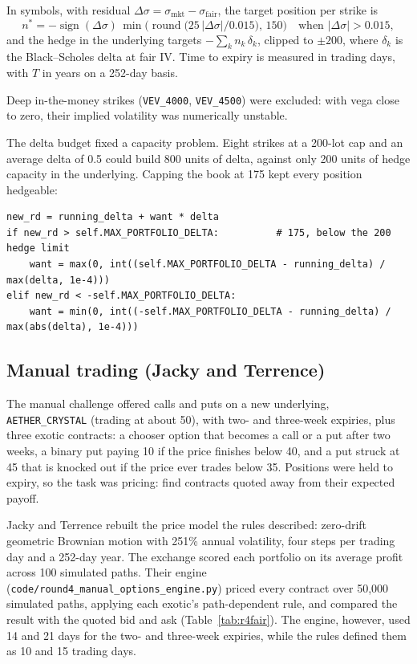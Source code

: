 \documentclass[11pt,a4paper]{article}
\newcommand{\pname}[1]{\texttt{#1}}
\begin{document}
In symbols, with residual $\Delta\sigma=\sigma_{\text{mkt}}-\sigma_{\text{fair}}$, the target position per
strike is
\[
n^\ast=-\operatorname{sign}(\Delta\sigma)\,\min\!\Big(\operatorname{round}\big(25\,|\Delta\sigma|/0.015\big),\,150\Big)
\quad\text{when } |\Delta\sigma|>0.015,
\]
and the hedge in the underlying targets $-\sum_k n_k\,\delta_k$, clipped to $\pm200$, where $\delta_k$ is the
Black--Scholes delta at fair IV. Time to expiry is measured in trading days, with $T$ in years on a 252-day
basis.

Deep in-the-money strikes (\pname{VEV\_4000}, \pname{VEV\_4500}) were excluded: with vega close to zero, their
implied volatility was numerically unstable.

The delta budget fixed a capacity problem. Eight strikes at a 200-lot cap and an average delta of 0.5 could
build 800 units of delta, against only 200 units of hedge capacity in the underlying. Capping the book at 175
kept every position hedgeable:

\noindent\begin{minipage}{\linewidth}
\begin{lstlisting}
new_rd = running_delta + want * delta
if new_rd > self.MAX_PORTFOLIO_DELTA:          # 175, below the 200 hedge limit
    want = max(0, int((self.MAX_PORTFOLIO_DELTA - running_delta) / max(delta, 1e-4)))
elif new_rd < -self.MAX_PORTFOLIO_DELTA:
    want = min(0, int((-self.MAX_PORTFOLIO_DELTA - running_delta) / max(abs(delta), 1e-4)))
\end{lstlisting}
\end{minipage}



\FloatBarrier
\subsection{Manual trading (Jacky and Terrence)}
The manual challenge offered calls and puts on a new underlying, \pname{AETHER\_CRYSTAL} (trading at about 50),
with two- and three-week expiries, plus three exotic contracts: a chooser option that becomes a call or a put
after two weeks, a binary put paying 10 if the price finishes below 40, and a put struck at 45 that is knocked
out if the price ever trades below 35. Positions were held to expiry, so the task was pricing: find contracts
quoted away from their expected payoff.

Jacky and Terrence rebuilt the price model the rules described: zero-drift geometric Brownian motion with
251\% annual volatility, four steps per trading day and a 252-day year. The exchange scored each portfolio on its
average profit across 100 simulated paths. Their engine
(\texttt{code/round4\_manual\_options\_engine.py}) priced every contract over 50,000 simulated paths, applying
each exotic's path-dependent rule, and compared the result with the quoted bid and ask (Table~\ref{tab:r4fair}).
The engine, however, used 14 and 21 days for the two- and three-week expiries, while the rules defined them as 10
and 15 trading days.
\end{document}
